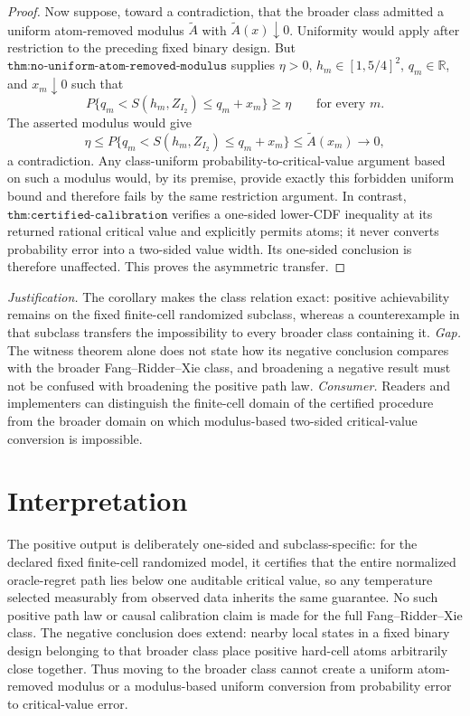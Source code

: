 \documentclass{article}
\begin{document}
\begin{proof}
Now suppose, toward a contradiction, that the broader class admitted a uniform atom-removed modulus \(\widetilde A\) with \(\widetilde A(x)\downarrow0\).  Uniformity would apply after restriction to the preceding fixed binary design.  But \(\texttt{thm:no-uniform-atom-removed-modulus}\) supplies \(\eta>0\), \(h_m\in[1,5/4]^2\), \(q_m\in\mathbb R\), and \(x_m\downarrow0\) such that
\[
 P\{q_m<S(h_m,Z_{I_2})\leq q_m+x_m\}\geq\eta
 \qquad\text{for every }m.
\]
The asserted modulus would give
\[
 \eta
 \leq P\{q_m<S(h_m,Z_{I_2})\leq q_m+x_m\}
 \leq \widetilde A(x_m)
 \longrightarrow0,
\]
a contradiction.  Any class-uniform probability-to-critical-value argument based on such a modulus would, by its premise, provide exactly this forbidden uniform bound and therefore fails by the same restriction argument.  In contrast, \(\texttt{thm:certified-calibration}\) verifies a one-sided lower-CDF inequality at its returned rational critical value and explicitly permits atoms; it never converts probability error into a two-sided value width.  Its one-sided conclusion is therefore unaffected.  This proves the asymmetric transfer.
\end{proof}
\par\smallskip\noindent \textit{Justification.} The corollary makes the class relation exact: positive achievability remains on the fixed finite-cell randomized subclass, whereas a counterexample in that subclass transfers the impossibility to every broader class containing it. \textit{Gap.} The witness theorem alone does not state how its negative conclusion compares with the broader Fang--Ridder--Xie class, and broadening a negative result must not be confused with broadening the positive path law. \textit{Consumer.} Readers and implementers can distinguish the finite-cell domain of the certified procedure from the broader domain on which modulus-based two-sided critical-value conversion is impossible.

\section{Interpretation}

The positive output is deliberately one-sided and subclass-specific: for the declared fixed finite-cell randomized model, it certifies that the entire normalized oracle-regret path lies below one auditable critical value, so any temperature selected measurably from observed data inherits the same guarantee. No such positive path law or causal calibration claim is made for the full Fang--Ridder--Xie class. The negative conclusion does extend: nearby local states in a fixed binary design belonging to that broader class place positive hard-cell atoms arbitrarily close together. Thus moving to the broader class cannot create a uniform atom-removed modulus or a modulus-based uniform conversion from probability error to critical-value error.
\end{document}
